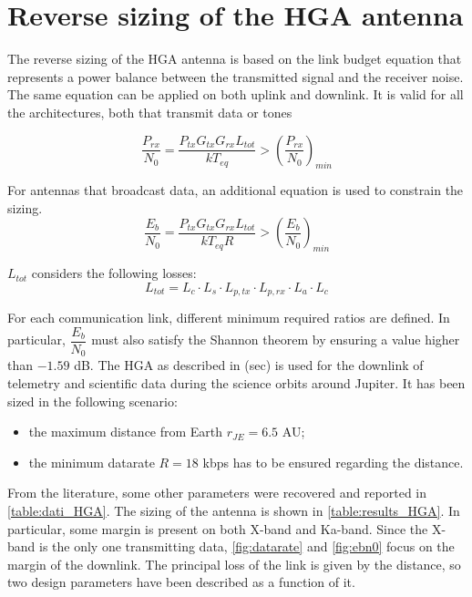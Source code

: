 \section{Reverse sizing of the HGA antenna}
\label{sec:HGA_sizing}

The reverse sizing of the HGA antenna is based on the link budget equation that represents a power balance between the transmitted signal and the receiver noise. The same equation can be applied on both uplink and downlink. It is valid for all the architectures, both that transmit data or tones

\begin{equation}
    \dfrac{P_{rx}}{N_0} = \dfrac{P_{tx} G_{tx} G_{rx} L_{tot}}{k T_{eq}} > \left( \dfrac{P_{rx}}{N_0} \right)_{min}
\end{equation}

For antennas that broadcast data, an additional equation is used to constrain the sizing.
\begin{equation}
    \dfrac{E_b}{N_0} = \dfrac{P_{tx} G_{tx} G_{rx} L_{tot}}{k T_{eq} R} > \left( \dfrac{E_b}{N_0} \right)_{min}
\end{equation}

$L_{tot}$ considers the following losses:
\begin{equation}
    L_{tot} = L_{c} \cdot L_{s} \cdot L_{p,tx} \cdot L_{p,rx} \cdot L_{a} \cdot L_{c}
\end{equation}

For each communication link, different minimum required ratios are defined. In particular, $\dfrac{E_b}{N_0}$ must also satisfy the Shannon theorem by ensuring a value higher than $-1.59$ dB. 
The HGA as described in (sec) is used for the downlink of telemetry and scientific data during the science orbits around Jupiter. It has been sized in the following scenario: 
\begin{itemize}
    \item the maximum distance from Earth $r_{JE} = 6.5$ AU;
    \item the minimum datarate $R = 18$ kbps has to be ensured regarding the distance.
\end{itemize}

From the literature, some other parameters were recovered and reported in \autoref{table:dati_HGA}. The sizing of the antenna is shown in \autoref{table:results_HGA}. In particular, some margin is present on both X-band and Ka-band. Since the X-band is the only one transmitting data, \autoref{fig:datarate} and \autoref{fig:ebn0} focus on the margin of the downlink. The principal loss of the link is given by the distance, so two design parameters have been described as a function of it. 

